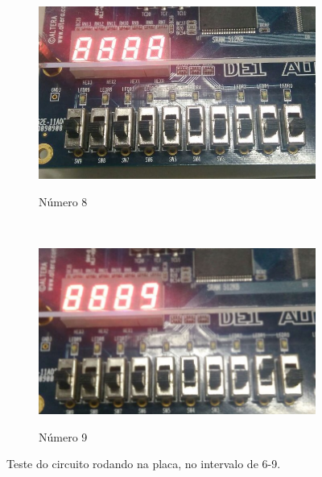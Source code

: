 \begin{figure}[H]
			\begin{subfigure}[b]{0.44\textwidth}
				\includegraphics[width=\textwidth]{img/etapa1/8}
				\label{fig:etapa1-8}
				\caption{Número 8}
			\end{subfigure}
			~
			\begin{subfigure}[b]{0.44\textwidth}
				\includegraphics[width=\textwidth]{img/etapa1/9}
				\label{fig:etapa1-9}
				\caption{Número 9}
			\end{subfigure}

			\caption{Teste do circuito rodando na placa, no intervalo de 6-9.}\label{fig:estapa1Teste2}
		\end{figure}

